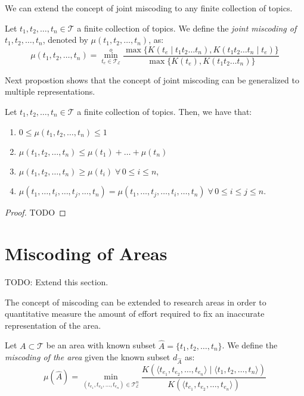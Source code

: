 We can extend the concept of joint miscoding to any finite collection of topics.

\begin{definition}
Let $t_1, t_2, \ldots, t_n \in \mathcal{T}$ a finite collection of topics. We define the \emph{joint miscoding of} $t_1, t_2, \ldots, t_n$, denoted by $\mu(t_1, t_2, \ldots, t_n)$, as:
\[
\mu(t_1, t_2, \ldots, t_n) = \overset{o}{ \underset{t_e \in \mathcal{T}_\mathcal{E}} \min} \frac{ \max\{ K(t_e \mid t_1 t_2 \ldots t_n), K(t_1 t_2 \ldots t_n \mid t_e) \} } { \max\{ K(t_e), K(t_1 t_2 \ldots t_n) \} }
\]
\end{definition}

Next propostion shows that the concept of joint miscoding can be generalized to multiple representations.

\begin{proposition}
Let $t_1, t_2, \ldots, t_n \in \mathcal{T}$ a finite collection of topics. Then, we have that:

\renewcommand{\theenumi}{\roman{enumi}}
\begin{enumerate}
\item $0 \leq \mu(t_1, t_2, \ldots, t_n) \leq 1$
\item $\mu(t_1, t_2, \ldots, t_n) \leq \mu(t_1) + \ldots + \mu(t_n)$
\item $\mu(t_1, t_2, \ldots, t_n) \geq \mu(t_i) \; \forall \, 0 \leq i \leq n$,
\item $\mu(t_1, \ldots, t_i, \ldots, t_j, \ldots, t_n) = \mu(t_1, \ldots, t_j, \ldots, t_i, \ldots, t_n) \; \forall \, 0 \leq i \leq j \leq n$.
\end{enumerate}
\end{proposition}
\begin{proof}
{\color{red} TODO}
\end{proof}

%
%
\section{Miscoding of Areas}

{\color{red} TODO: Extend this section.}

The concept of miscoding can be extended to research areas in order to quantitative measure the amount of effort required to fix an inaccurate representation of the area.

\begin{definition}
Let $A \subset \mathcal{T}$ be an area with known subset $\hat{A} = \{t_1, t_2, \ldots, t_n\}$. We define the \emph{miscoding of the area} given the known subset $d_{\hat{A}}$ as:
\[
\mu(\hat{A}) = \min_{(t_{e_1}, t_{e_2}, \ldots, t_{e_n}) \in \mathcal{T}_\mathcal{E}^n}  \frac{K \left( \langle t_{e_1}, t_{e_2}, \ldots, t_{e_n} \rangle \mid \langle t_1, t_2, \ldots, t_n \rangle \right) }{K \left( \langle t_{e_1}, t_{e_2}, \ldots, t_{e_n} \rangle \right)}
\]
\end{definition}

